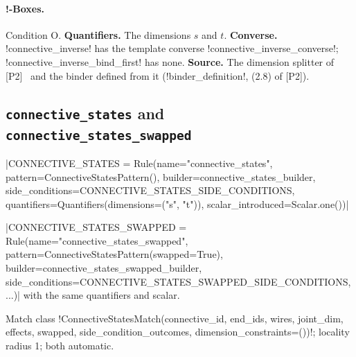 \paragraph{!-Boxes.} Condition O. \textbf{Quantifiers.} The dimensions $s$ and $t$. \textbf{Converse.} \azx!connective_inverse! has the template converse \azx!connective_inverse_converse!; \azx!connective_inverse_bind_first! has none. \textbf{Source.} The dimension splitter of [P2]~\cite{wang2023qufinitezxw} and the binder defined from it (\py!binder_definition!, (2.8) of [P2]).

\subsection{\texttt{connective\_states} and \texttt{connective\_states\_swapped}}\label{sec:rules-connective-states}

\begin{signature}
\py|CONNECTIVE_STATES = Rule(name="connective_states", pattern=ConnectiveStatesPattern(), builder=connective_states_builder, side_conditions=CONNECTIVE_STATES_SIDE_CONDITIONS, quantifiers=Quantifiers(dimensions=("s", "t")), scalar_introduced=Scalar.one())|

\py|CONNECTIVE_STATES_SWAPPED = Rule(name="connective_states_swapped", pattern=ConnectiveStatesPattern(swapped=True), builder=connective_states_swapped_builder, side_conditions=CONNECTIVE_STATES_SWAPPED_SIDE_CONDITIONS, ...)| with the same quantifiers and scalar.

Match class \py!ConnectiveStatesMatch(connective_id, end_ids, wires, joint_dim, effects, swapped, side_condition_outcomes, dimension_constraints=())!; locality radius 1; both automatic.
\end{signature}

